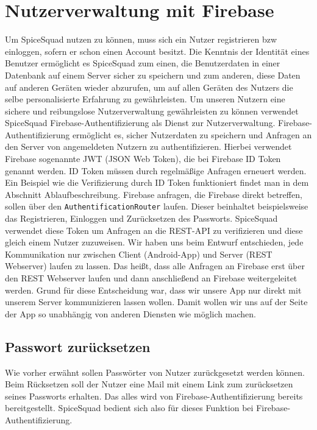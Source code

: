 \documentclass{entwurfsheft}
\begin{document}
\newpage

\section{Nutzerverwaltung mit Firebase}\label{sec:Nutzerverwaltung}
Um SpiceSquad nutzen zu können, muss sich ein Nutzer registrieren bzw einloggen, sofern er schon einen Account besitzt.
Die Kenntnis der Identität eines Benutzer ermöglicht es SpiceSquad zum einen, die Benutzerdaten in einer Datenbank auf einem Server sicher zu speichern und zum anderen, diese Daten auf anderen Geräten wieder abzurufen, um auf allen Geräten des Nutzers die selbe personalisierte Erfahrung zu gewährleisten.
Um unseren Nutzern eine sichere und reibungslose Nutzerverwaltung gewährleisten zu können verwendet SpiceSquad Firebase-Authentifizierung als Dienst zur Nutzerverwaltung.
Firebase-Authentifizierung ermöglicht es, sicher Nutzerdaten zu speichern und Anfragen an den Server von angemeldeten Nutzern zu authentifizieren.
Hierbei verwendet Firebase sogenannte JWT (JSON Web Token), die bei Firebase ID Token genannt werden.
ID Token müssen durch regelmäßige Anfragen erneuert werden.
Ein Beispiel wie die Verifizierung durch ID Token funktioniert findet man in dem Abschnitt Ablaufbeschreibung.
Firebase anfragen, die Firebase direkt betreffen, sollen über den \texttt{AuthentificationRouter} laufen.
Dieser beinhaltet beispielsweise das Registrieren, Einloggen und Zurücksetzen des Passworts.
SpiceSquad verwendet diese Token um Anfragen an die REST-API zu verifizieren und diese gleich einem Nutzer zuzuweisen.
Wir haben uns beim Entwurf entschieden, jede Kommunikation nur zwischen Client (Android-App) und Server (REST Webserver) laufen zu lassen. Das heißt, dass alle Anfragen an Firebase erst über den REST Webserver laufen und dann anschließend an Firebase weitergeleitet werden.
Grund für diese Entscheidung war, dass wir unsere App nur direkt mit unserem Server kommunizieren lassen wollen. Damit wollen wir uns auf der Seite der App so unabhängig von anderen Diensten wie möglich machen.

\subsection{Passwort zurücksetzen}
Wie vorher erwähnt sollen Passwörter von Nutzer zurückgesetzt werden können. Beim Rücksetzen soll der Nutzer eine Mail mit einem Link zum zurücksetzen seines Passworts erhalten.
Das alles wird von Firebase-Authentifizierung bereits bereitgestellt. SpiceSquad bedient sich also für dieses Funktion bei Firebase-Authentifizierung.
\end{document}
